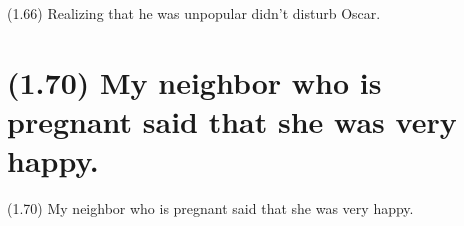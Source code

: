 \documentclass{article}
\begin{document}
\bigbreak
\begin{enumerate*}
\item[(1.66)] Realizing that he was unpopular didn't disturb Oscar.
\end{enumerate*}
\bigbreak

\bigbreak
\begin{minipage}{\textwidth}
\end{minipage}
\bigbreak

\clearpage

%
%

\section*{(1.70) My neighbor who is pregnant said that she was very happy.}

\bigbreak
\begin{enumerate*}
\item[(1.70)] My neighbor who is pregnant said that she was very happy.
\end{enumerate*}
\bigbreak

\bigbreak
\begin{minipage}{\textwidth}
\end{minipage}
\bigbreak
\end{document}

